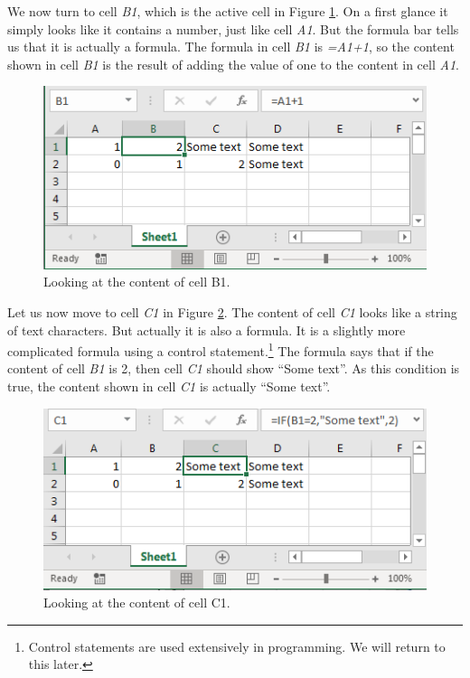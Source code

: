 \documentclass[]{book}
\let\rmarkdownfootnote\footnote%
\def\footnote{\protect\rmarkdownfootnote}
\begin{document}
We now turn to cell \emph{B1}, which is the active cell in Figure \ref{fig:ex5}. On a first glance it simply looks like it contains a number, just like cell \emph{A1}. But the formula bar tells us that it is actually a formula. The formula in cell \emph{B1} is \emph{=A1+1}, so the content shown in cell \emph{B1} is the result of adding the value of one to the content in cell \emph{A1}.

\begin{figure}

{\centering \includegraphics[width=0.75\linewidth]{_resources/chapter_excelbasic/ex3} 

}

\caption{Looking at the content of cell B1.}\label{fig:ex5}
\end{figure}

Let us now move to cell \emph{C1} in Figure \ref{fig:ex6}. The content of cell \emph{C1} looks like a string of text characters. But actually it is also a formula. It is a slightly more complicated formula using a control statement.\footnote{Control statements are used extensively in programming. We will return to this later.} The formula says that if the content of cell \emph{B1} is 2, then cell \emph{C1} should show ``Some text''. As this condition is true, the content shown in cell \emph{C1} is actually ``Some text''.

\begin{figure}

{\centering \includegraphics[width=0.75\linewidth]{_resources/chapter_excelbasic/ex4} 

}

\caption{Looking at the content of cell C1.}\label{fig:ex6}
\end{figure}
\end{document}
